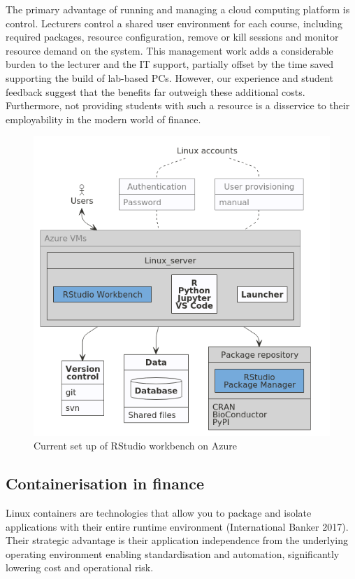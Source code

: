 \documentclass{article}
\begin{document}
The primary advantage of running and managing a cloud computing platform
is control. Lecturers control a shared user environment for each course,
including required packages, resource configuration, remove or kill
sessions and monitor resource demand on the system. This management work
adds a considerable burden to the lecturer and the IT support, partially
offset by the time saved supporting the build of lab-based PCs. However,
our experience and student feedback suggest that the benefits far
outweigh these additional costs. Furthermore, not providing students
with such a resource is a disservice to their employability in the
modern world of finance.

\begin{figure}

{\centering \includegraphics[width=0.7\linewidth]{img/rstudiowb} 

}

\caption{Current set up of RStudio workbench on Azure}\label{fig:current-setup}
\end{figure}

\hypertarget{containerisation-in-finance}{%
\subsection{Containerisation in
finance}\label{containerisation-in-finance}}

Linux containers are technologies that allow you to package and isolate
applications with their entire runtime environment (International Banker
2017). Their strategic advantage is their application independence from
the underlying operating environment enabling standardisation and
automation, significantly lowering cost and operational risk.
\end{document}
